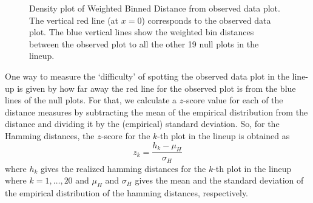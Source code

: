 \documentclass[12]{report}
\begin{document}
\begin{figure}[hbtp]
   \centering
	\vspace{-.1in}
       \caption{Density plot of Weighted Binned Distance from observed data plot.  The vertical red line (at $x=0$)  corresponds to the observed data plot. The blue vertical lines show the weighted bin distances between the observed plot to all the other 19 null plots in the lineup.  }
       \label{emp_wbdist}
\end{figure}

One way to measure the `difficulty' of spotting the observed data plot in the line-up is given by how far away the red line for the observed plot is from the blue lines of the null plots. For that, 
we calculate a $z$-score value for each of the distance measures by subtracting the mean of the empirical distribution from the distance %
and dividing it by the (empirical) standard deviation. 
So, for the Hamming distances,  the $z$-score for the $k$-th plot in the lineup is obtained as 
\[
z_k = \frac{h_k - \mu_H}{\sigma_H}
\]
where $h_k$ gives the realized hamming distances for the $k$-th plot in the lineup where $k = 1, \dots, 20$ and $\mu_H$ and $\sigma_H$ gives the mean and the standard deviation of the empirical distribution of the hamming distances, respectively. 
\end{document}
